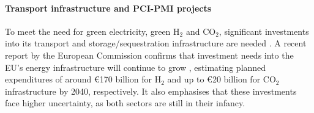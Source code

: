 \documentclass[pdflatex,sn-nature]{sn-jnl}%
\theoremstyle{thmstyleone}%
\theoremstyle{thmstyletwo}%
\theoremstyle{thmstylethree}%
\begin{document}

\paragraph{Transport infrastructure and PCI-PMI projects}
To meet the need for green electricity, green H$_2$ and CO$_2$, significant investments into its transport and storage/sequestration infrastructure are needed \cite{kountourisUnifiedEuropeanHydrogen2024,neumannPotentialRoleHydrogen2023,cerniauskasOptionsNaturalGas2020}. A recent report by the European Commission confirms that investment needs into the EU's energy infrastructure will continue to grow \cite{europeancommission.directorategeneralforenergy.InvestmentNeedsEuropean2025}, estimating planned expenditures of around €170 billion for H$_2$ and up to €20 billion for CO$_2$ infrastructure by 2040, respectively. It also emphasises that these investments face higher uncertainty, as both sectors are still in their infancy. 
\end{document}
